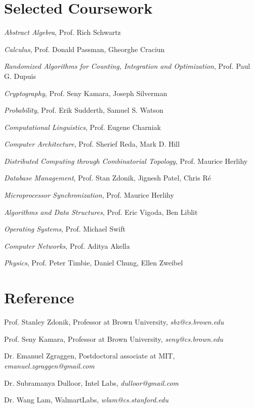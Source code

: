 \documentclass[letterpaper]{article}
\renewenvironment{itemize}{
  \begin{list}{}{
    \setlength{\leftmargin}{1.5em}
  }
}{
  \end{list}
}
\begin{document}
\section*{Selected Coursework}
\begin{itemize}
\item \textit{Abstract Algebra}, Prof. Rich Schwartz
\item \textit{Calculus}, Prof. Donald Passman, Gheorghe Craciun
\item \textit{Randomized Algorithms for Counting, Integration and Optimization}, Prof. Paul G. Dupuis
\item \textit{Cryptography}, Prof. Seny Kamara, Joseph Silverman
\item \textit{Probability}, Prof. Erik Sudderth, Samuel S. Watson 
\item \textit{Computational Linguistics}, Prof. Eugene Charniak
\item \textit{Computer Architecture}, Prof. Sherief Reda, Mark D. Hill
\item \textit{Distributed Computing through Combinatorial Topology}, Prof. Maurice Herlihy
\item \textit{Database Management}, Prof. Stan Zdonik, Jignesh Patel, Chris R\'e
\item \textit{Microprocessor Synchronization}, Prof. Maurice Herlihy
\item \textit{Algorithms and Data Structures}, Prof. Eric Vigoda, Ben Liblit
\item \textit{Operating Systems}, Prof. Michael Swift
\item \textit{Computer Networks}, Prof. Aditya Akella
\item \textit{Physics}, Prof. Peter Timbie, Daniel Chung, Ellen Zweibel
\end{itemize}


\section*{Reference}
\begin{itemize}

\item Prof. Stanley Zdonik, Professor at Brown University, \textit{sbz@cs.brown.edu}
\item Prof. Seny Kamara, Professor at Brown University, \textit{seny@cs.brown.edu}
\item Dr. Emanuel Zgraggen, Postdoctoral associate at MIT, \textit{emanuel.zgraggen@gmail.com}
\item Dr. Subramanya Dulloor, Intel Labs, \textit{dulloor@gmail.com}
\item Dr. Wang Lam, WalmartLabs, \textit{wlam@cs.stanford.edu}

\end{itemize}

\bigskip
\end{document}

